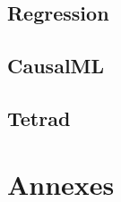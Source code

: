 \documentclass[12pt,letterpaper]{article}
\begin{document}
\subsection{Regression}

\subsection{CausalML}

\subsection{Tetrad}




\clearpage




\clearpage
\section{Annexes}
\end{document}
